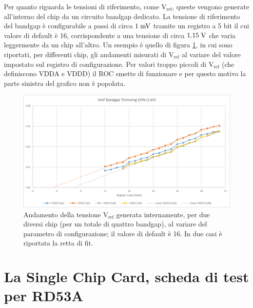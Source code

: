 Per quanto riguarda le tensioni di riferimento, come $\mathrm{V_{ref}}$, queste vengono generate all'interno del chip da un circuito bandgap dedicato.
La tensione di riferimento del bandgap è configurabile a passi di circa $1\rm \; mV$ tramite un registro a 5 bit il cui valore di default \`e 16, corrispondente a una tensione di circa $1.15\rm \; V$ che varia leggermente da un chip all'altro.
Un esempio è quello di figura \ref{bandgap_trimming}, in cui sono riportati, per differenti chip, gli andamenti misurati di $\mathrm{V_{ref}}$ al variare del valore impostato sul registro di configurazione. Per valori troppo piccoli di $\mathrm{V_{ref}}$ (che definiscono VDDA e VDDD) il ROC smette di funzionare e per questo motivo la parte sinistra del grafico non \`e popolata.
\begin{figure}
\centering
\includegraphics[scale=.5]{Immagini/bandgap_trimming}
\caption{Andamento della tensione $\mathrm{V_{ref}}$ generata internamente, per due diversi chip (per un totale di quattro bandgap), al variare del parametro di configurazione; il valore di default è 16. In due casi \`e riportata la retta di fit.}
\label{bandgap_trimming}
\end{figure}

\section{La Single Chip Card, scheda di test per RD53A}

